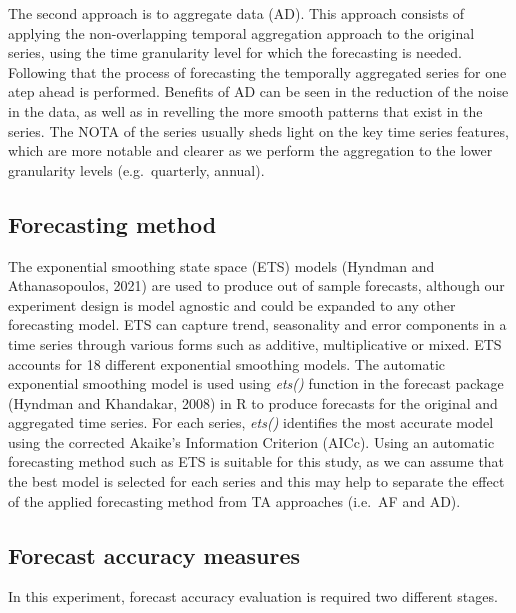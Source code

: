 \documentclass[]{elsarticle} %
\begin{document}
The second approach is to aggregate data (AD). This approach consists of
applying the non-overlapping temporal aggregation approach to the
original series, using the time granularity level for which the
forecasting is needed. Following that the process of forecasting the
temporally aggregated series for one atep ahead is performed. Benefits
of AD can be seen in the reduction of the noise in the data, as well as
in revelling the more smooth patterns that exist in the series. The NOTA
of the series usually sheds light on the key time series features, which
are more notable and clearer as we perform the aggregation to the lower
granularity levels (e.g.~quarterly, annual).

\hypertarget{forecasting-method}{%
\subsection{Forecasting method}\label{forecasting-method}}

The exponential smoothing state space (ETS) models (Hyndman and
Athanasopoulos, 2021) are used to produce out of sample forecasts,
although our experiment design is model agnostic and could be expanded
to any other forecasting model. ETS can capture trend, seasonality and
error components in a time series through various forms such as
additive, multiplicative or mixed. ETS accounts for 18 different
exponential smoothing models. The automatic exponential smoothing model
is used using \emph{ets()} function in the forecast package (Hyndman and
Khandakar, 2008) in R to produce forecasts for the original and
aggregated time series. For each series, \emph{ets()} identifies the
most accurate model using the corrected Akaike's Information Criterion
(AICc). Using an automatic forecasting method such as ETS is suitable
for this study, as we can assume that the best model is selected for
each series and this may help to separate the effect of the applied
forecasting method from TA approaches (i.e.~AF and AD).

\hypertarget{errormetric}{%
\subsection{Forecast accuracy measures}\label{errormetric}}

In this experiment, forecast accuracy evaluation is required two
different stages.
\end{document}
